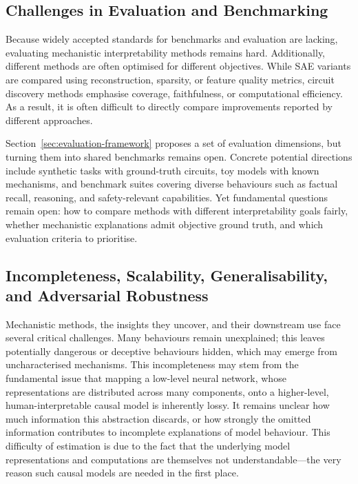 \subsection{Challenges in Evaluation and Benchmarking}
Because widely accepted standards for benchmarks and evaluation are lacking, evaluating mechanistic interpretability methods remains hard. Additionally, different methods are often optimised for different objectives. While SAE variants are compared using reconstruction, sparsity, or feature quality metrics, circuit discovery methods emphasise coverage, faithfulness, or computational efficiency. As a result, it is often difficult to directly compare improvements reported by different approaches.

Section~\ref{sec:evaluation-framework} proposes a set of evaluation dimensions, but turning them into shared benchmarks remains open. Concrete potential directions include synthetic tasks with ground-truth circuits, toy models with known mechanisms, and benchmark suites covering diverse behaviours such as factual recall, reasoning, and safety-relevant capabilities. Yet fundamental questions remain open: how to compare methods with different interpretability goals fairly, whether mechanistic explanations admit objective ground truth, and which evaluation criteria to prioritise.

\subsection{Incompleteness, Scalability, Generalisability, and Adversarial Robustness}
\label{subsec: scalability and adversarial robustness}






Mechanistic methods, the insights they uncover, and their downstream use face several critical challenges. Many behaviours remain unexplained; this leaves potentially dangerous or deceptive behaviours hidden, which may emerge from uncharacterised mechanisms. 
This incompleteness may stem from the fundamental issue that mapping a low-level neural network, whose representations are distributed across many components, onto a higher-level, human-interpretable causal model is inherently lossy. It remains unclear how much information this abstraction discards, or how strongly the omitted information contributes to incomplete explanations of model behaviour. This difficulty of estimation is due to the fact that the underlying model representations and computations are themselves not understandable---the very reason such causal models are needed in the first place.

